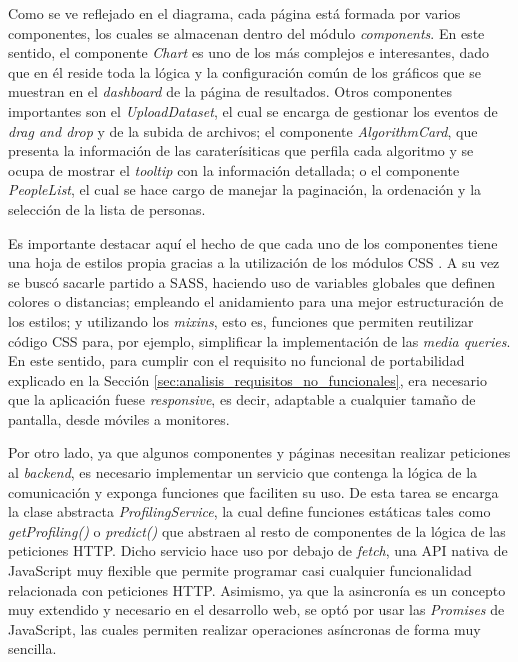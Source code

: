 \bigskip
Como se ve reflejado en el diagrama, cada página está formada por varios componentes, los cuales se almacenan dentro del módulo \textit{components}.
En este sentido, el componente \textit{Chart} es uno de los más complejos e interesantes, dado que en él reside toda la lógica y la configuración común
 de los gráficos que se muestran en el \textit{dashboard} de la página de resultados. Otros componentes importantes son el \textit{UploadDataset},
el cual se encarga de gestionar los eventos de \textit{drag and drop} y de la subida de archivos; el componente \textit{AlgorithmCard}, que
presenta la información de las caraterísiticas que perfila cada algoritmo y se ocupa de mostrar el \textit{tooltip} con la información detallada;
o el componente \textit{PeopleList}, el cual se hace cargo de manejar la paginación, la ordenación y la selección de la lista de personas.

\bigskip
Es importante
destacar aquí el hecho de que cada uno de los componentes tiene una hoja de estilos propia gracias a la utilización de los módulos CSS \cite{cssmodules}. A su vez
se buscó sacarle partido a SASS, haciendo uso de variables globales que definen colores o distancias; empleando el anidamiento para una mejor
estructuración de los estilos; y utilizando los \textit{mixins}, esto es, funciones que permiten reutilizar código CSS para, por ejemplo, simplificar la implementación de las \textit{media queries}. En este
sentido, para cumplir con el requisito no funcional de portabilidad explicado en la Sección \ref{sec:analisis_requisitos_no_funcionales}, 
era necesario que la aplicación fuese \textit{responsive}, es decir, adaptable a cualquier tamaño de pantalla, desde móviles a monitores.


\bigskip
Por otro lado, ya que algunos componentes y páginas necesitan realizar peticiones al \textit{backend}, es necesario implementar un servicio
que contenga la lógica de la comunicación y exponga funciones que faciliten su uso. De esta tarea se encarga la clase abstracta \textit{ProfilingService},
la cual define funciones estáticas tales como \textit{getProfiling()} o \textit{predict()} que abstraen al resto de componentes de la lógica de las peticiones HTTP.
Dicho servicio hace uso por debajo de \textit{fetch}, una API nativa de JavaScript muy flexible que permite programar casi cualquier funcionalidad
relacionada con peticiones HTTP. Asimismo, ya que la asincronía es un concepto muy extendido y necesario en el desarrollo web, se optó
por usar las \textit{Promises} de JavaScript, las cuales permiten realizar operaciones asíncronas de forma muy sencilla.

